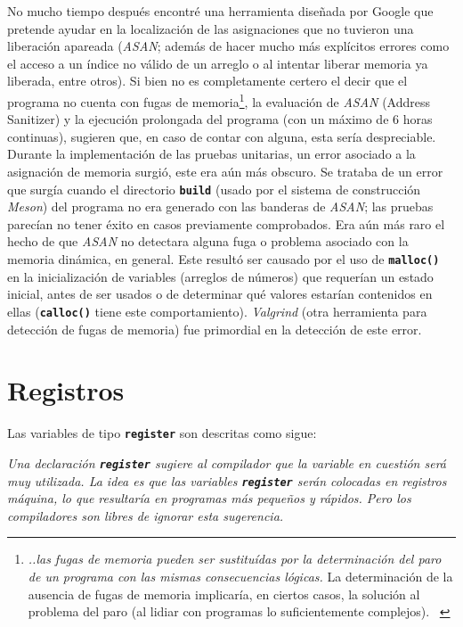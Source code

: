 \documentclass[a4paper]{report}
\begin{document}
No mucho tiempo despu\'es encontr\'e una herramienta dise\~nada por Google que pretende ayudar en la localizaci\'on
de las asignaciones que no tuvieron una liberaci\'on apareada (\textit{ASAN}; adem\'as de hacer mucho m\'as
expl\'icitos errores como el acceso a un \'indice no v\'alido de un arreglo o al intentar liberar memoria ya
liberada, entre otros).
Si bien no es completamente certero el decir que el programa no cuenta con fugas de memoria\footnote{\textit{..las
    fugas de memoria pueden ser sustitu\'idas por la determinaci\'on del paro de un programa con las mismas
    consecuencias l\'ogicas.} La determinaci\'on de la ausencia de fugas de memoria implicar\'ia, en ciertos casos,
  la soluci\'on al problema del paro (al lidiar con programas lo suficientemente complejos). ~\cite{samsai}}, la
evaluaci\'on de \textit{ASAN} (Address Sanitizer) y la ejecuci\'on prolongada del programa (con un m\'aximo de 6
horas continuas), sugieren que, en caso de contar con alguna, esta ser\'ia despreciable.\\

Durante la implementaci\'on de las pruebas unitarias, un error asociado a la asignaci\'on de memoria surgi\'o,
este era a\'un m\'as obscuro. Se trataba de un error que surg\'ia cuando el directorio \textbf{\texttt{build}} (usado por
el sistema de construcci\'on \textit{Meson}) del programa no era generado con las banderas de \textit{ASAN};
las pruebas parec\'ian no tener \'exito en casos previamente comprobados. Era a\'un m\'as raro el hecho de que
\textit{ASAN} no detectara alguna fuga o problema asociado con la memoria din\'amica, en general. Este result\'o
ser causado por el uso de \textbf{\texttt{malloc()}} en la inicializaci\'on de variables (arreglos de n\'umeros)
que requer\'ian un estado inicial, antes de ser usados o de determinar qu\'e valores estar\'ian contenidos en
ellas (\textbf{\texttt{calloc()}} tiene este comportamiento). \textit{Valgrind} (otra herramienta para detecci\'on
de fugas de memoria) fue primordial en la detecci\'on de este error.\\

\section{Registros}
Las variables de tipo \textbf{\texttt{register}} son descritas como sigue:
\begin{center}
  \textit{Una declaraci\'on \texttt{\textbf{register}} sugiere al compilador que la variable en cuesti\'on
    ser\'a muy utilizada. La idea es que las variables \texttt{\textbf{register}} ser\'an colocadas en registros
    m\'aquina, lo que resultar\'ia en programas m\'as peque\~nos y r\'apidos. Pero los compiladores son libres
    de ignorar esta sugerencia.~\cite{cpl}}
\end{center}
\end{document}
